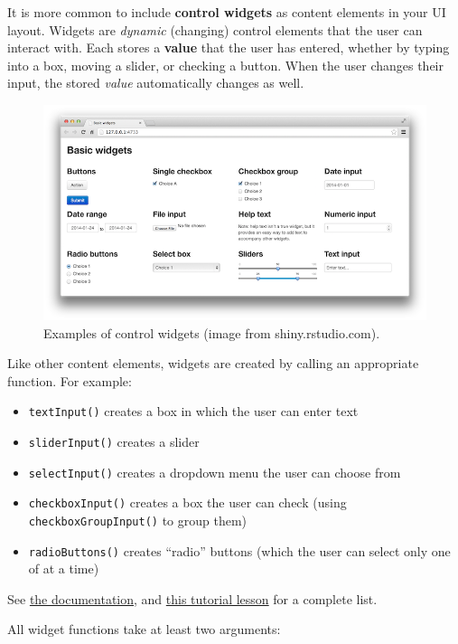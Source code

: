 \documentclass[]{book}
\providecommand{\tightlist}{%
  \setlength{\itemsep}{0pt}\setlength{\parskip}{0pt}}
\theoremstyle{definition}
\theoremstyle{definition}
\theoremstyle{remark}
\begin{document}
It is more common to include \textbf{control widgets} as content
elements in your UI layout. Widgets are \emph{dynamic} (changing)
control elements that the user can interact with. Each stores a
\textbf{value} that the user has entered, whether by typing into a box,
moving a slider, or checking a button. When the user changes their
input, the stored \emph{value} automatically changes as well.

\begin{figure}
\centering
\includegraphics{img/shiny/basic-widgets.png}
\caption{Examples of control widgets (image from shiny.rstudio.com).}
\end{figure}

Like other content elements, widgets are created by calling an
appropriate function. For example:

\begin{itemize}
\tightlist
\item
  \texttt{textInput()} creates a box in which the user can enter text
\item
  \texttt{sliderInput()} creates a slider
\item
  \texttt{selectInput()} creates a dropdown menu the user can choose
  from
\item
  \texttt{checkboxInput()} creates a box the user can check (using
  \texttt{checkboxGroupInput()} to group them)
\item
  \texttt{radioButtons()} creates ``radio'' buttons (which the user can
  select only one of at a time)
\end{itemize}

See \href{http://shiny.rstudio.com/reference/shiny/latest/}{the
documentation}, and
\href{http://shiny.rstudio.com/tutorial/lesson3/}{this tutorial lesson}
for a complete list.

All widget functions take at least two arguments:
\end{document}
